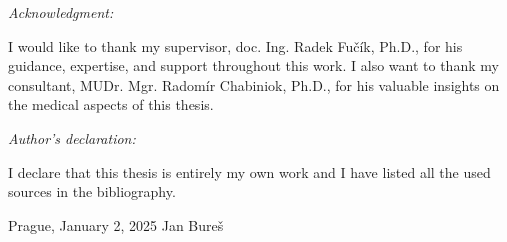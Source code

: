 \newpage
\noindent \vspace*{0pt} %
\emph{\Large{}Acknowledgment:}{\Large\par}

\noindent I would like to thank my supervisor, doc. Ing. Radek Fučík, Ph.D., for his guidance, expertise, and support throughout this work. I also want to thank my consultant, MUDr. Mgr. Radomír Chabiniok, Ph.D., for his valuable insights on the medical aspects of this thesis.

\vspace*{\fill} %

\noindent \emph{\Large{}Author’s declaration:}{\Large\par}

\noindent I declare that this thesis is entirely my own work and I have listed all the used sources in the bibliography.

\bigskip{}

\noindent Prague, January 2, 2025 \hfill{}Jan Bureš

\newpage{}